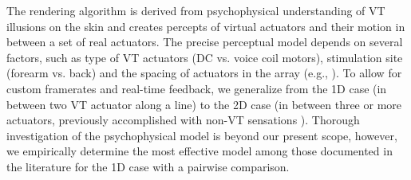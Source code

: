 The rendering algorithm is derived from %
psychophysical understanding of VT illusions on the skin and creates percepts of virtual actuators and their motion in between a set of real actuators.
The precise perceptual model depends on several factors, such as type of VT actuators (DC vs. voice coil motors), stimulation site (forearm vs. back) and the spacing of actuators in the array (e.g., \cite{Israr2011a}).
To allow for custom framerates and real-time feedback, we generalize from the 1D case (in between two VT actuator along a line) to the 2D case (in between three or more actuators, previously accomplished with non-VT sensations \cite{Tanie1980}).
Thorough investigation of the psychophysical model is beyond our present scope, however, we empirically determine 
the most effective model among those  %
 documented in the literature for the 1D case with a 
pairwise comparison.


